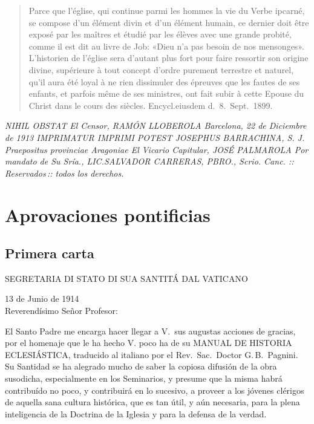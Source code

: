 \raggedbottom{} \documentclass[12pt, a4paper]{book}
\begin{document}
\begin{quotation}
  Parce que l'église, qui continue parmi les hommes la vie du Verbe ipcarné, se compose d'un élément divin et d'un élément humain, ce dernier doit être exposé par les maîtres et étudié par les élèves avec une grande probité, comme il est dit au livre de Job: «Dieu n'a pas besoin de nos mensonges». L'historien de l'église sera d'autant plus fort pour faire ressortir son origine divine, supérieure à tout concept d'ordre purement terrestre et naturel, qu'il aura été loyal à ne rien dissimuler des épreuves que les fautes de ses enfants, et parfois même de ses ministres, ont fait subir à cette Epouse du Christ dans le cours des siècles.
  Encycl.\@ eiusdem d.\ 8.\ Sept.\ 1899.
\end{quotation}
\textit{
  \noindent NIHIL OBSTAT
  El Censor,
  RAMÓN LLOBEROLA
  Barcelona, 22 de Diciembre de 1913
  IMPRIMATUR
  IMPRIMI POTEST
  JOSEPHUS BARRACHINA, S. J.
  Praepositus provinciae Aragoniae
  El Vicario Capitular,
  JOSÉ PALMAROLA
  Por mandato de Su Sría.,
  LIC.\@ SALVADOR CARRERAS, PBRO.,
  Scrio. Canc.
  \quad::\, Reservados\,:: \quad
  todos los derechos.}
\newpage
\section{Aprovaciones pontificias}
\subsection{Primera carta}
\begin{center}
  \large SEGRETARIA DI STATO DI SUA SANTITÁ DAL VATICANO
\end{center}
\begin{flushright}
  13 de Junio de 1914\\
  Reverendísimo Señor Profesor:
\end{flushright}

El Santo Padre me encarga hacer llegar a V.\ sus augustas acciones de gracias, por el homenaje que le ha hecho V. poco ha de su MANUAL DE HISTORIA ECLESIÁSTICA, traducido al italiano por el Rev.\, Sac.\, Doctor G.\,B.\, Pagnini. Su Santidad se ha alegrado mucho de saber la copiosa difusión de la obra susodicha, especialmente en los Seminarios, y presume que la misma habrá contribuído no poco, y contribuirá en lo sucesivo, a proveer a los jóvenes clérigos de aquella sana cultura histórica, que es tan útil, y aún necesaria, para la plena inteligencia de la Doctrina de la Iglesia y para la defensa de la verdad.
\end{document}

